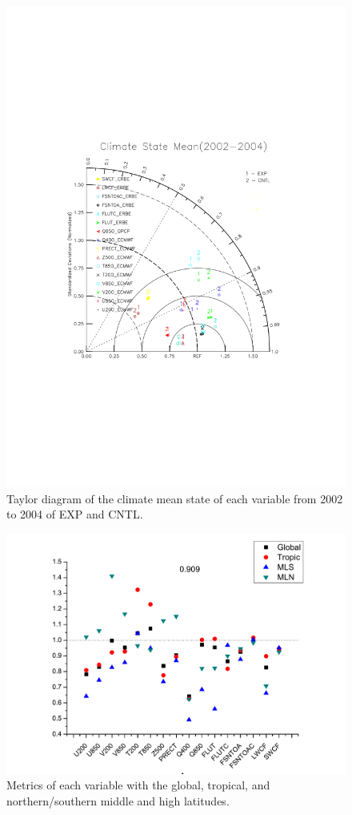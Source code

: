 \documentclass[gmd, manuscript]{copernicus}
\begin{document}
\begin{figure}[t]
\includegraphics[width=12cm]{taylor}
\caption{Taylor diagram of the climate mean state of each variable from 2002 to 2004 of EXP and CNTL.}
\end{figure}

\begin{figure}[t]
\includegraphics[width=15.3cm]{reg}
\caption{Metrics of each variable with the global, tropical, and northern/southern middle and high latitudes.}
\end{figure}
\end{document}
